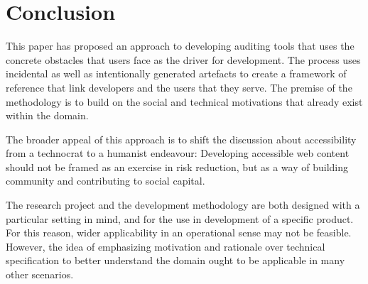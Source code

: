 
\section{Conclusion} %
\label{sec:conclusion}

This paper has proposed an approach to developing auditing tools that uses the concrete obstacles that users face as the driver for development. The process uses incidental as well as intentionally generated artefacts to create a framework of reference that link developers and the users that they serve. The premise of the methodology is to build on the social and technical motivations that already exist within the domain.

The broader appeal of this approach is to shift the discussion about accessibility from a technocrat to a humanist endeavour: Developing accessible web content should not be framed as an exercise in risk reduction, but as a way of building community and contributing to social capital. 

The research project and the development methodology are both designed with a particular setting in mind, and for the use in development of a specific product. For this reason, wider applicability in an operational sense may not be feasible. However, the idea of emphasizing motivation and rationale over technical specification to better understand the domain ought to be applicable in many other scenarios.

